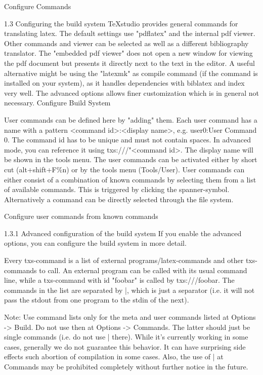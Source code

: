 \documentclass{article}
\begin{document}
	Configure Commands
	
	1.3 Configuring the build system
	TeXstudio provides general commands for translating latex.
	The default settings use "pdflatex" and the internal pdf viewer. Other commands and viewer can be selected as well as a different bibliography translator.
	The "embedded pdf viewer" does not open a new window for viewing the pdf document but presents it directly next to the text in the editor.
	A useful alternative might be using the "latexmk" as compile command (if the command is installed on your system), as it handles dependencies with biblatex and index very well.
	The advanced options allows finer customization which is in general not necessary.
	Configure Build System
	
	User commands can be defined here by "adding" them. Each user command has a name with a pattern <command id>:<display name>, e.g. user0:User Command 0. The command id has to be unique and must not contain spaces. In advanced mode, you can reference it using txs:///"<command id>. The display name will be shown in the tools menu. The user commands can be activated either by short cut (alt+shift+F\%n) or by the tools menu (Tools/User).
	User commands can either consist of a combination of known commands by selecting them from a list of available commands. This is triggered by clicking the spanner-symbol.
	Alternatively a command can be directly selected through the file system.
	
	Configure user commands from known commands
	
	1.3.1 Advanced configuration of the build system
	If you enable the advanced options, you can configure the build system in more detail.
	
	Every txs-command is a list of external programs/latex-commands and other txs-commands to call. An external program can be called with its usual command line, while a txs-command with id "foobar" is called by txs:///foobar.
	The commands in the list are separated by |, which is just a separator (i.e. it will not pass the stdout from one program to the stdin of the next).
	
	Note: Use command lists only for the meta and user commands listed at Options -> Build. Do not use then at Options -> Commands. The latter should just be single commands (i.e. do not use | there). While it's currently working in some cases, generally we do not guarantee this behavior. It can have surprising side effects such abortion of compilation in some cases. Also, the use of | at Commands may be prohibited completely without further notice in the future.
	
\end{document}
